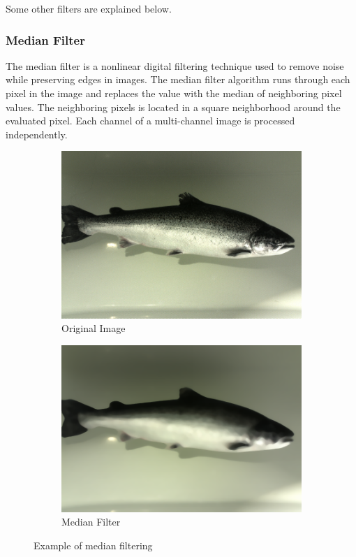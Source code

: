 Some other filters are explained below.


\subsubsection{Median Filter}
The median filter is a nonlinear digital filtering technique used to remove noise while preserving edges in images. The median filter algorithm runs through each pixel in the image and replaces the value with the median of neighboring pixel values. The neighboring pixels is located in a square neighborhood around the evaluated pixel. Each channel of a multi-channel image is processed independently. 

\begin{figure}[h]
    \centering
    \begin{subfigure}{0.5\textwidth}
        \centering
        \includegraphics[width=.98\linewidth]{images/literature/original_fish}
        \caption{Original Image}
    \end{subfigure}%
    \begin{subfigure}{.5\textwidth}
        \centering
        \includegraphics[width=.98\linewidth]{images/literature/medianblur}
        \caption{Median Filter}
    \end{subfigure}
    \caption{Example of median filtering}
    \label{fig:median_filter}
\end{figure}


